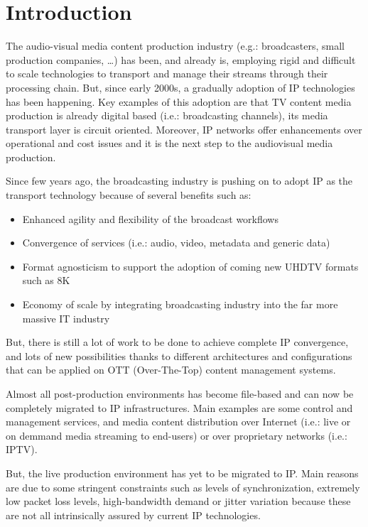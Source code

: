 \cleardoublepage
{}
\chapter*{Introduction}
 
The audio-visual media content production industry (e.g.: broadcasters, small production companies, \ldots) has been, and already is, employing rigid and difficult to scale technologies to transport and manage their streams through their processing chain. But, since early 2000s, a gradually adoption of IP technologies has been happening. Key examples of this adoption are that TV content media production is already digital based (i.e.: broadcasting channels), its media transport layer is circuit oriented. Moreover, IP networks offer enhancements over operational and cost issues and it is the next step to the audiovisual media production.

Since few years ago, the broadcasting industry is pushing on to adopt IP as the transport technology because of several benefits such as:

\begin{itemize}
  \item Enhanced agility and flexibility of the broadcast workflows
  \item Convergence of services (i.e.: audio, video, metadata and generic data)
  \item Format agnosticism to support the adoption of coming new UHDTV formats such as 8K 
  \item Economy of scale by integrating broadcasting industry into the far more massive IT industry
\end{itemize}

But, there is still a lot of work to be done to achieve complete IP convergence, and lots of new possibilities thanks to different architectures and configurations that can be applied on OTT (Over-The-Top) content management systems. 

Almost all post-production environments has become file-based and can now be completely migrated to IP infrastructures. Main examples are some control and management services, and media content distribution over Internet (i.e.: live or on demmand media streaming to end-users) or over proprietary networks (i.e.: IPTV).

But, the live production environment has yet to be migrated to IP. Main reasons are due to some stringent constraints such as levels of synchronization, extremely low packet loss levels, high-bandwidth demand or jitter variation because these are not all intrinsically assured by current IP technologies.

